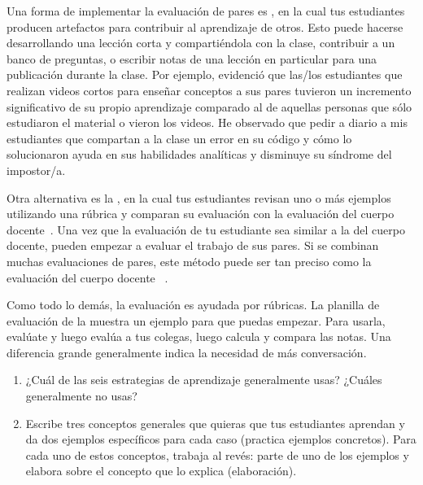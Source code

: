 Una forma de implementar la evaluación de pares es ,
en la cual tus estudiantes producen artefactos para contribuir al aprendizaje de otros.
Esto puede hacerse desarrollando una lección corta y compartiéndola con la clase,
contribuir a un banco de preguntas,
o escribir notas de una lección en particular para una publicación durante la clase.
Por ejemplo,
\cite{Fran2018} evidenció que las/los estudiantes que realizan videos cortos para enseñar conceptos a sus pares
tuvieron un incremento significativo de su propio aprendizaje
comparado al de aquellas personas que sólo estudiaron el material o vieron los videos.
He observado que pedir a diario a mis estudiantes que compartan a la clase un error en su código 
y cómo lo solucionaron ayuda en sus habilidades analíticas y disminuye su síndrome del impostor/a.

Otra alternativa es la ,
en la cual tus estudiantes revisan uno o más ejemplos utilizando una rúbrica
y comparan su evaluación con la evaluación del cuerpo docente~\cite{Kulk2013}.
Una vez que la evaluación de tu estudiante sea similar a la del cuerpo docente,
pueden empezar a evaluar el trabajo de sus pares.
Si se combinan muchas evaluaciones de pares,
este método puede ser tan preciso como la evaluación del cuerpo docente ~\cite{Pare2008}.

Como todo lo demás,
la evaluación es ayudada por rúbricas.
La planilla de evaluación de la  muestra un ejemplo para que puedas empezar.
Para usarla,
evalúate y luego evalúa a tus colegas,
luego calcula y compara las notas.
Una diferencia grande generalmente indica la necesidad de más conversación.



\begin{enumerate}

\item
  ¿Cuál de las seis estrategias de aprendizaje generalmente usas?
  ¿Cuáles generalmente no usas?

\item
  Escribe tres conceptos generales que quieras que tus estudiantes aprendan
  y da dos ejemplos específicos para cada caso
  (practica ejemplos concretos).
  Para cada uno de estos conceptos,
  trabaja al revés: parte de uno de los ejemplos y elabora sobre el concepto que lo explica
  (elaboración).

\end{enumerate}

